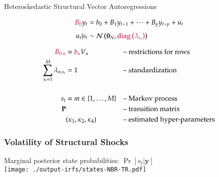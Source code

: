 \documentclass[notes,blackandwhite,mathsans,usenames,dvipsnames]{beamer}
\begin{document}
\begin{frame}{Heteroskedastic Structural Vector Autoregressions}

\begin{align*}
{\color{purple}B_0} y_{t} &= b_0 + B_1 y_{t-1} + \dots + B_p y_{t-p} + u_t\\[1ex]
u_t|s_t &\sim \mathcal{N}\left( \mathbf{0}_N, {\color{purple}\text{diag}\left( \lambda_{s_t} \right)} \right)
\end{align*}

\begin{align*}
{\color{purple}B_{0.n}}&={\color{purple}b_n}V_n&& \text{-- restrictions for rows}\\
\sum_{s_t=1}^{M} \lambda_{n.s_t}&=1 && \text{-- standardization}\\[3ex]
s_t&=m\in\{1,\dots,M\}&& \text{-- Markov process}\\
\mathbf{P}&&& \text{-- transition matrix}\\
&(\kappa_1,\kappa_2,\kappa_4)&& \text{-- estimated hyper-parameters}\\
\end{align*}

\end{frame}




\begin{frame}
	\frametitle{Volatility of Structural Shocks}

\begin{center}
{\color{mcxs2}Marginal posterior state probabilities:} $\Pr[s_t|\mathbf{y}]$\\
\texttt{[image: ./output-irfs/states-NBR-TR.pdf]}
\end{center}    

\end{frame}
\end{document}
